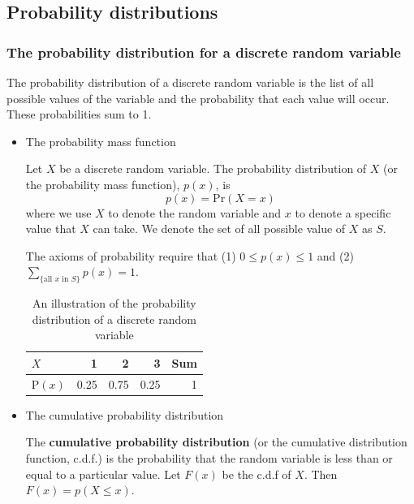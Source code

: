 \documentclass[a4paper,11pt]{article}
\begin{document}
\subsection{Probability distributions}
\label{sec:org6e3a9bc}

\subsubsection*{The probability distribution for a discrete random variable}
\label{sec:org5da6f32}

The probability distribution of a discrete random variable is the list
of all possible values of the variable and the probability that each
value will occur. These probabilities sum to 1. 

\begin{itemize}
\item The probability mass function
\label{sec:org1c017c5}

Let \(X\) be a discrete random variable. The probability distribution of
\(X\) (or the probability mass function), \(p(x)\), is
\begin{equation*}
p(x) = \mathrm{Pr}(X = x)
\end{equation*}
where we use \(X\) to denote the random variable and \(x\) to denote a
specific value that \(X\) can take. We denote the set of all possible
value of \(X\) as \(S\). 

The axioms of probability require that (1) \(0 \leq p(x) \leq
1\) and (2) \(\sum_{ \{\text{all } x \text{ in } S \} } p(x) =
1\).

\begin{table}[htbp]
\caption{\label{tab:orgd6e1d7d}
An illustration of the probability distribution of a discrete random variable}
\centering
\begin{tabular}{lrrrr}
\toprule
\(X\) & 1 & 2 & 3 & Sum\\
\midrule
\(\mathrm{P}(x)\) & 0.25 & 0.75 & 0.25 & 1\\
\bottomrule
\end{tabular}
\end{table}

\item The cumulative probability distribution
\label{sec:org5c834c3}

The \textbf{cumulative probability distribution} (or the cumulative
distribution function, c.d.f.) is the probability that the random variable is
less than or equal to a particular value. Let \(F(x)\) be the c.d.f of
\(X\). Then \(F(x) = p(X \leq x)\). 


\end{itemize}
\end{document}
